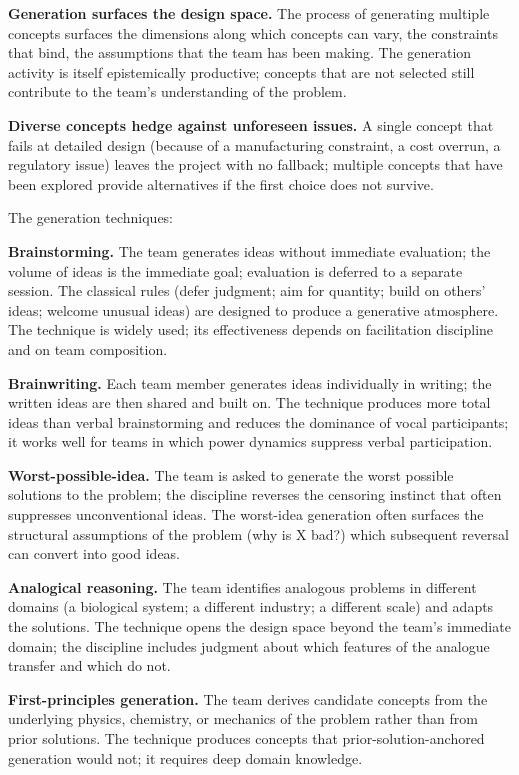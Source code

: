 \textbf{Generation surfaces the design space.} The process of generating multiple concepts surfaces the dimensions along which concepts can vary, the constraints that bind, the assumptions that the team has been making. The generation activity is itself epistemically productive; concepts that are not selected still contribute to the team's understanding of the problem.

\textbf{Diverse concepts hedge against unforeseen issues.} A single concept that fails at detailed design (because of a manufacturing constraint, a cost overrun, a regulatory issue) leaves the project with no fallback; multiple concepts that have been explored provide alternatives if the first choice does not survive.

The generation techniques:

\textbf{Brainstorming.} The team generates ideas without immediate evaluation; the volume of ideas is the immediate goal; evaluation is deferred to a separate session. The classical rules (defer judgment; aim for quantity; build on others' ideas; welcome unusual ideas) are designed to produce a generative atmosphere. The technique is widely used; its effectiveness depends on facilitation discipline and on team composition.

\textbf{Brainwriting.} Each team member generates ideas individually in writing; the written ideas are then shared and built on. The technique produces more total ideas than verbal brainstorming and reduces the dominance of vocal participants; it works well for teams in which power dynamics suppress verbal participation.

\textbf{Worst-possible-idea.} The team is asked to generate the worst possible solutions to the problem; the discipline reverses the censoring instinct that often suppresses unconventional ideas. The worst-idea generation often surfaces the structural assumptions of the problem (why is X bad?) which subsequent reversal can convert into good ideas.

\textbf{Analogical reasoning.} The team identifies analogous problems in different domains (a biological system; a different industry; a different scale) and adapts the solutions. The technique opens the design space beyond the team's immediate domain; the discipline includes judgment about which features of the analogue transfer and which do not.

\textbf{First-principles generation.} The team derives candidate concepts from the underlying physics, chemistry, or mechanics of the problem rather than from prior solutions. The technique produces concepts that prior-solution-anchored generation would not; it requires deep domain knowledge.

